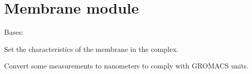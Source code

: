 \documentclass[letterpaper,10pt,english]{sphinxmanual}
\begin{document}
\sphinxstepscope


\section{Membrane module}
\label{\detokenize{membrane:module-membrane}}\label{\detokenize{membrane:membrane-module}}\label{\detokenize{membrane::doc}}

\begin{fulllineitems}
\label{\detokenize{membrane:membrane.Membrane}}
\pysigstartsignatures
{}
\pysigstopsignatures
\sphinxAtStartPar
Bases: 

\sphinxAtStartPar
Set the characteristics of the membrane in the complex.

\begin{fulllineitems}
\label{\detokenize{membrane:membrane.Membrane.set_nanom}}
\pysigstartsignatures
{}
\pysigstopsignatures
\sphinxAtStartPar
Convert some measurements to nanometers to comply with GROMACS units.

\end{fulllineitems}


\end{fulllineitems}


\sphinxstepscope
\end{document}

